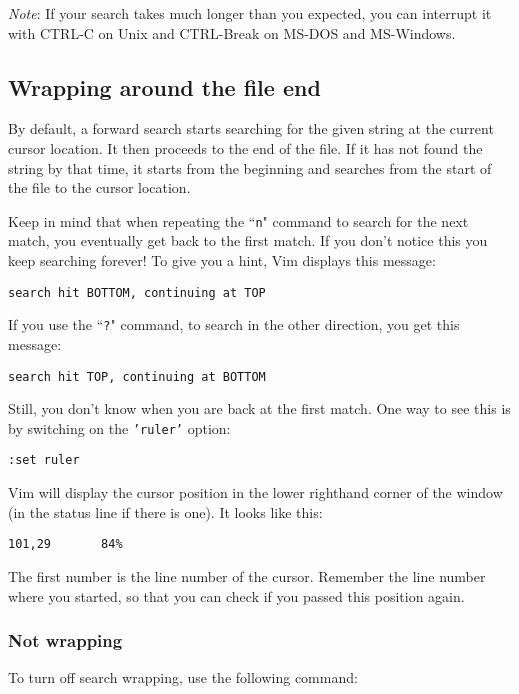 \emph{Note}: If your search takes much longer than you expected, you can interrupt it with CTRL-C on Unix and  CTRL-Break on MS-DOS and MS-Windows.
\subsection{Wrapping around the file end}
By default, a forward search starts searching for the given string at the current cursor location.
It then proceeds to the end of the file.
If it has not found the string by that time, it starts from the beginning and searches from the start of the file to the cursor location.

Keep in mind that when repeating the ``\texttt{n}" command to search for the next match, you eventually get back to the first match.
If you don't notice this you keep searching forever!  To give you a hint, Vim displays this message:

\begin{Verbatim}[samepage=true]
    search hit BOTTOM, continuing at TOP
\end{Verbatim}

If you use the ``\texttt{?}" command, to search in the other direction, you get this message:

\begin{Verbatim}[samepage=true]
    search hit TOP, continuing at BOTTOM
\end{Verbatim}

Still, you don't know when you are back at the first match.
One way to see this is by switching on the \texttt{'ruler'} option:

\begin{Verbatim}[samepage=true]
 :set ruler
\end{Verbatim}

Vim will display the cursor position in the lower righthand corner of the window (in the status line if there is one).
It looks like this:

\begin{Verbatim}[samepage=true]
    101,29       84%
\end{Verbatim}

The first number is the line number of the cursor.
Remember the line number where you started, so that you can check if you passed this position again.
\subsubsection{Not wrapping}
To turn off search wrapping, use the following command:

